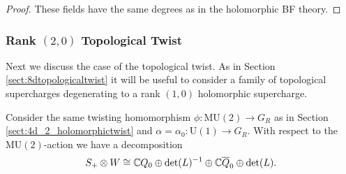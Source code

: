 \documentclass[10pt, oneside]{article}
\newcommand{\MU}{\mathrm{MU}}
\renewcommand{\U}{\mathrm{U}}
\begin{document}
\begin{proof}
These fields have the same degrees as in the holomorphic BF theory.

\begin{comment}
and hence the underlying local $L_\infty$ algebra after the twist becomes

\[
\xymatrix@R=0.5cm@C=0.5cm{
\ul{0} & \ul{1} & \ul{2} & \ul{3} & \\ 
\Omega^0(\CC^2; \gg)_c \ar[r] &\Omega^{0,1}(\CC^2; \gg)_{A_{0,1}} \ar[r] &\Omega^{0,2}(\CC^2; \gg)_{B} \\
  & \Omega^{2,0}(\CC^2 ; \gg)_{B^*} \ar[r] & \Omega^{2,1}(\CC^2 ; \gg)_{A_{0,1}^*} \ar[r] & \Omega^{2,2}(\CC^2 ; \gg)_{c^*} \\
  }
\]

\[
\xymatrix@R=0.5cm@C=0.5cm{
\ul{-4n+2} & \ul{-4n+3} & \ul{-4n+4} & \cdots & \ul{4n-1} & \ul{4n} & \ul{4n+1} \\ 
 &&&& \Omega^0(\CC^2; \gg)_a \ar[r] &\Omega^{0,1}(\CC^2; \gg)_{b} \ar[r] &\Omega^{0,2}(\CC^2; \gg)_{\xi^*} \\
 \Omega^{2,0}(\CC^2; \gg)_\xi \ar[r] &\Omega^{2,1}(\CC^2; \gg)_{b^*} \ar[r] &\Omega^{2,2}(\CC^2; \gg)_{a^*}  \\
}
\]

\[
\xymatrix@R=0.5cm@C=0.5cm{
\ul{-2n+1} & \ul{-2n+2} & \ul{-2n+3} & \cdots & \ul{2n} & \ul{2n+1} & \ul{2n+2} \\ 
\Omega^0(\CC^2 ; U)_\phi \ar[r] & \Omega^{0,1}(\CC^2 ; U)_\psi \ar[r] & \Omega^{0,2}(\CC^2 ; U)_{\varphi^*} \\
& & & & \Omega^{2,0}(\CC^2 ; U)_{\varphi} \ar[r] & \Omega^{2,1}(\CC^2 ; U)_{\psi^*} \ar[r] & \Omega^{2,2}(\CC^2 ; U)_{\phi^*}
}
\]
\end{comment}
\end{proof}

\subsubsection{Rank \texorpdfstring{$(2,0)$}{(2,0)} Topological Twist}
\label{sect:4d2Donaldson}

Next we discuss the case of the topological twist. As in Section \ref{sect:8dtopologicaltwist} it will be useful to consider a family of topological supercharges degenerating to a rank $(1, 0)$ holomorphic supercharge.

Consider the same twisting homomorphism $\phi\colon \MU(2)\rightarrow G_R$ as in Section \ref{sect:4d_2_holomorphictwist} and $\alpha=\alpha_0\colon \U(1)\rightarrow G_R$. With respect to the $\MU(2)$-action we have a decomposition
\[S_+\otimes W\cong \mathbb C Q_0 \oplus \det(L)^{-1}\oplus \mathbb C \overline{Q}_0\oplus \det(L).\]
\end{document}

